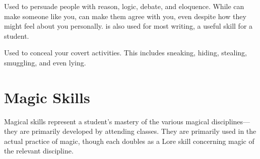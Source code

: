 
Used to persuade people with reason, logic, debate, and eloquence.
While  can make someone like you,  can make them agree with you, even despite how they might feel about you personally.
 is also used for most writing, a useful skill for a student.


Used to conceal your covert activities.
This includes sneaking, hiding, stealing, smuggling, and even lying.

\section{Magic Skills}

Magical skills represent a student's mastery of the various magical disciplines---they are primarily developed by attending classes.
They are primarily used in the actual practice of magic, though each doubles as a Lore skill concerning magic of the relevant discipline. %
